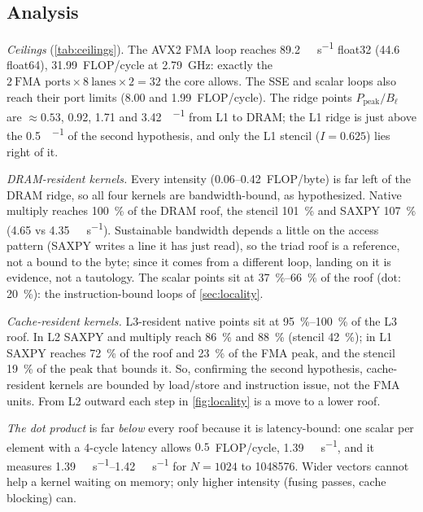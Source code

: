 \subsection{Analysis}
\emph{Ceilings} (\cref{tab:ceilings}). The AVX2 FMA loop reaches \qty{89.2}{\giga\flop\per\second}
float32 (\num{44.6} float64), \num{31.99}~FLOP/cycle at \qty{2.79}{\giga\hertz}: exactly the
$2~\text{FMA ports} \times 8~\text{lanes} \times 2 = 32$ the core allows. The SSE and scalar loops
also reach their port limits (\num{8.00} and \num{1.99}~FLOP/cycle). The ridge points $P_{\text{peak}}/B_\ell$ are $\approx\num{0.53}$, \num{0.92},
\num{1.71} and \qty{3.42}{\flop\per\byte} from L1 to DRAM; the L1 ridge is just above the
\qty{0.5}{\flop\per\byte} of the second hypothesis, and only the L1 stencil ($I=\num{0.625}$) lies
right of it.

\emph{DRAM-resident kernels.} Every intensity (\numrange{0.06}{0.42}~FLOP/byte) is far left of the
DRAM ridge, so all four kernels are bandwidth-bound, as hypothesized. Native multiply reaches
\SI{100}{\percent} of the DRAM roof, the stencil \SI{101}{\percent} and SAXPY \SI{107}{\percent}
(\num{4.65} vs \qty{4.35}{\giga\flop\per\second}). Sustainable bandwidth depends a little on the
access pattern (SAXPY writes a line it has just read), so the triad roof is a reference, not a bound
to the byte; since it comes from a different loop, landing on it is evidence, not a tautology. The scalar points sit at \SIrange{37}{66}{\percent} of the
roof (dot: \SI{20}{\percent}): the instruction-bound loops of \cref{sec:locality}.

\emph{Cache-resident kernels.} L3-resident native points sit at \SIrange{95}{100}{\percent} of the
L3 roof. In L2 SAXPY and multiply reach \SI{86}{\percent} and \SI{88}{\percent} (stencil
\SI{42}{\percent}); in L1 SAXPY reaches \SI{72}{\percent} of the roof and \SI{23}{\percent} of the FMA
peak, and the stencil \SI{19}{\percent} of the peak that bounds it. So, confirming the second hypothesis,
cache-resident kernels are bounded by load/store and instruction issue, not the FMA units. From L2 outward each step in
\cref{fig:locality} is a move to a lower roof.

\emph{The dot product} is far \emph{below} every roof because it is latency-bound: one scalar
 per element with a \num{4}-cycle latency allows $0.5$~FLOP/cycle,
\qty{1.39}{\giga\flop\per\second}, and it measures \qtyrange{1.39}{1.42}{\giga\flop\per\second} for
$N=\num{1024}$ to \num{1048576}. Wider vectors cannot help a kernel waiting on memory; only
higher intensity (fusing passes, cache blocking) can.
